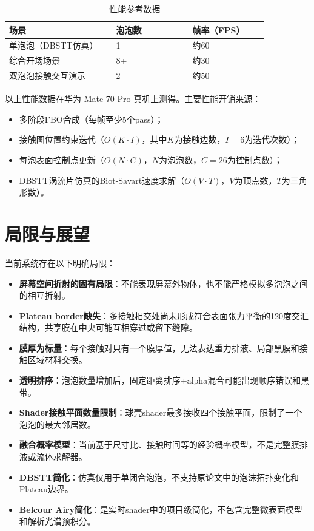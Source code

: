 \begin{table}[H]
  \centering
  \caption{性能参考数据}
  \begin{tabular}{p{0.35\linewidth}p{0.25\linewidth}p{0.25\linewidth}}
    \toprule
    场景 & 泡泡数 & 帧率（FPS） \\
    \midrule
    单泡泡（DBSTT仿真） & 1 & 约60 \\
    综合开场场景 & 8+ & 约30 \\
    双泡泡接触交互演示 & 2 & 约50 \\
    \bottomrule
  \end{tabular}
\end{table}

以上性能数据在华为 Mate 70 Pro 真机上测得。主要性能开销来源：
\begin{itemize}
  \item 多阶段FBO合成（每帧至少5个pass）；
  \item 接触图位置约束迭代（$O(K \cdot I)$，其中$K$为接触边数，$I=6$为迭代次数）；
  \item 每泡表面控制点更新（$O(N \cdot C)$，$N$为泡泡数，$C=26$为控制点数）；
  \item DBSTT涡流片仿真的Biot-Savart速度求解（$O(V \cdot T)$，$V$为顶点数，$T$为三角形数）。
\end{itemize}

\section{局限与展望}

当前系统存在以下明确局限：

\begin{itemize}
  \item \textbf{屏幕空间折射的固有局限}：不能表现屏幕外物体，也不能严格模拟多泡泡之间的相互折射。
  \item \textbf{Plateau border缺失}：多接触相交处尚未形成符合表面张力平衡的120度交汇结构，共享膜在中央可能互相穿过或留下缝隙。
  \item \textbf{膜厚为标量}：每个接触对只有一个膜厚值，无法表达重力排液、局部黑膜和接触区域材料交换。
  \item \textbf{透明排序}：泡泡数量增加后，固定距离排序+alpha混合可能出现顺序错误和黑带。
  \item \textbf{Shader接触平面数量限制}：球壳shader最多接收四个接触平面，限制了一个泡泡的最大邻居数。
  \item \textbf{融合概率模型}：当前基于尺寸比、接触时间等的经验概率模型，不是完整膜排液或流体求解器。
  \item \textbf{DBSTT简化}：仿真仅用于单闭合泡泡，不支持原论文中的泡沫拓扑变化和Plateau边界。
  \item \textbf{Belcour Airy简化}：是实时shader中的项目级简化，不包含完整微表面模型和解析光谱预积分。
\end{itemize}


